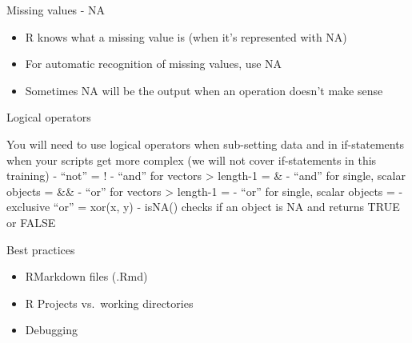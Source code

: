\documentclass[ignorenonframetext,]{beamer}
\providecommand{\tightlist}{%
  \setlength{\itemsep}{0pt}\setlength{\parskip}{0pt}}
\begin{document}
\begin{frame}{Missing values - NA}

\begin{itemize}
\tightlist
\item
  R knows what a missing value is (when it's represented with NA)
\item
  For automatic recognition of missing values, use NA
\item
  Sometimes NA will be the output when an operation doesn't make sense
\end{itemize}

\end{frame}

\begin{frame}{Logical operators}

You will need to use logical operators when sub-setting data and in
if-statements when your scripts get more complex (we will not cover
if-statements in this training) - ``not'' = ! - ``and'' for vectors
\textgreater{} length-1 = \& - ``and'' for single, scalar objects = \&\&
- ``or'' for vectors \textgreater{} length-1 = \textbar{} - ``or'' for
single, scalar objects = \textbar{}\textbar{} - exclusive ``or'' =
xor(x, y) - isNA() checks if an object is NA and returns TRUE or FALSE

\end{frame}

\begin{frame}{Best practices}

\begin{itemize}
\tightlist
\item
  RMarkdown files (.Rmd)
\item
  R Projects vs.~working directories
\item
  Debugging
\end{itemize}

\end{frame}
\end{document}
